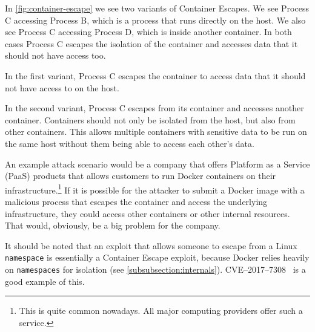 In \autoref{fig:container-escape} we see two variants of Container Escapes. We see Process C accessing Process B, which is a process that runs directly on the host. We also see Process C accessing Process D, which is inside another container. In both cases Process C escapes the isolation of the container and accesses data that it should not have access too.

In the first variant, Process C escapes the container to access data that it should not have access to on the host.

In the second variant, Process C escapes from its container and accesses another container. Containers should not only be isolated from the host, but also from other containers. This allows multiple containers with sensitive data to be run on the same host without them being able to access each other's data.


\medskip

An example attack scenario would be a company that offers Platform as a Service (PaaS) products that allows customers to run Docker containers on their infrastructure.\footnote{This is quite common nowadays. All major computing providers offer such a service.} If it is possible for the attacker to submit a Docker image with a malicious process that escapes the container and access the underlying infrastructure, they could access other containers or other internal resources. That would, obviously, be a big problem for the company.

\medskip

It should be noted that an exploit that allows someone to escape from a Linux \lstinline{namespace} is essentially a Container Escape exploit, because Docker relies heavily on \lstinline{namespaces} for isolation (see \autoref{subsubsection:internals}). CVE--2017--7308~\cite{CVE-2017-7308} is a good example of this.
